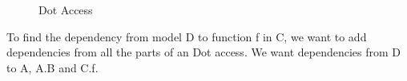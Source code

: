 \documentclass{cslthse-msc}
\begin{document}
\begin{figure}[H]
    \centering
    \qquad
    \subfloat{{}}
    \subfloat{{}}
    \caption{Dot Access}
    \label{fig:dotAccess}
\end{figure}

To find the dependency from model D to function f in C, we want to add dependencies from all the parts of an Dot access. We want dependencies from D to A, A.B and C.f.
\end{document}

